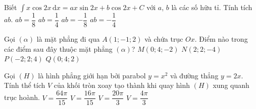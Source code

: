 \begin{ex}%
	Biết $\displaystyle \int x\cos2x\mathrm{\,d}x=ax\sin2x+b\cos2x+C$ với $a$, $b$ là các số hữu tỉ. Tính tích $ab$.
	\choice
	{\True $ab=\dfrac{1}{8}$}
	{$ab=\dfrac{1}{4}$}
	{$ab=-\dfrac{1}{8}$}
	{$ab=-\dfrac{1}{4}$}
\end{ex}

\begin{ex}%
	Gọi $(\alpha)$ là mặt phẳng đi qua $A(1; -1; 2)$ và chứa trục $Ox$. Điểm nào trong các điểm sau đây thuộc mặt phẳng $(\alpha)$?
	\choice
	{$M(0; 4; -2)$}
	{\True $N(2; 2; -4)$}
	{$P(-2; 2; 4)$}
	{$Q(0; 4; 2)$}
\end{ex}

\begin{ex}%
	Gọi $(H)$ là hình phẳng giới hạn bởi parabol $y=x^2$ và đường thẳng $y=2x$. Tính thể tích $V$ của khối tròn xoay tạo thành khi quay hình $(H)$ xung quanh trục hoành.
	\choice
	{\True $V=\dfrac{64\pi}{15}$}
	{$V=\dfrac{16\pi}{15}$}
	{$V=\dfrac{20\pi}{3}$}
	{ $V=\dfrac{4\pi}{3}$}
\end{ex}

